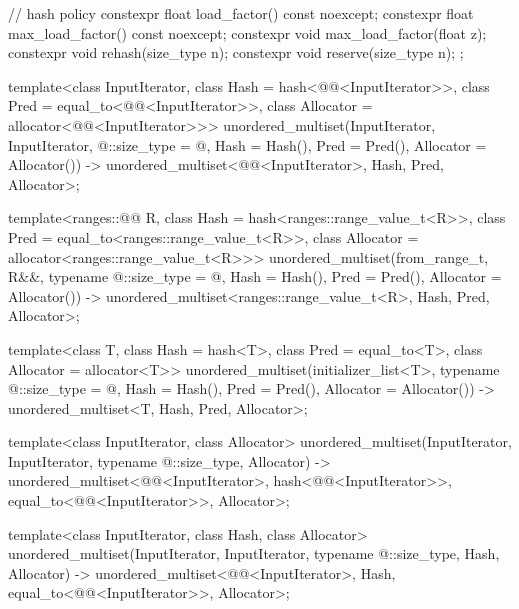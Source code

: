 \begin{codeblock}
{{    // hash policy
    constexpr float load_factor() const noexcept;
    constexpr float max_load_factor() const noexcept;
    constexpr void max_load_factor(float z);
    constexpr void rehash(size_type n);
    constexpr void reserve(size_type n);
  };

  template<class InputIterator,
           class Hash = hash<@@<InputIterator>>,
           class Pred = equal_to<@@<InputIterator>>,
           class Allocator = allocator<@@<InputIterator>>>
    unordered_multiset(InputIterator, InputIterator, @\seebelow@::size_type = @\seebelow@,
                       Hash = Hash(), Pred = Pred(), Allocator = Allocator())
      -> unordered_multiset<@@<InputIterator>,
                            Hash, Pred, Allocator>;

  template<ranges::@@ R,
           class Hash = hash<ranges::range_value_t<R>>,
           class Pred = equal_to<ranges::range_value_t<R>>,
           class Allocator = allocator<ranges::range_value_t<R>>>
    unordered_multiset(from_range_t, R&&, typename @\seebelow@::size_type = @\seebelow@,
                       Hash = Hash(), Pred = Pred(), Allocator = Allocator())
      -> unordered_multiset<ranges::range_value_t<R>, Hash, Pred, Allocator>;

  template<class T, class Hash = hash<T>,
           class Pred = equal_to<T>, class Allocator = allocator<T>>
    unordered_multiset(initializer_list<T>, typename @\seebelow@::size_type = @\seebelow@,
                       Hash = Hash(), Pred = Pred(), Allocator = Allocator())
      -> unordered_multiset<T, Hash, Pred, Allocator>;

  template<class InputIterator, class Allocator>
    unordered_multiset(InputIterator, InputIterator, typename @\seebelow@::size_type, Allocator)
      -> unordered_multiset<@@<InputIterator>,
                            hash<@@<InputIterator>>,
                            equal_to<@@<InputIterator>>,
                            Allocator>;

  template<class InputIterator, class Hash, class Allocator>
    unordered_multiset(InputIterator, InputIterator, typename @\seebelow@::size_type,
                       Hash, Allocator)
      -> unordered_multiset<@@<InputIterator>, Hash,
                            equal_to<@@<InputIterator>>,
                            Allocator>;

}
\end{codeblock}
